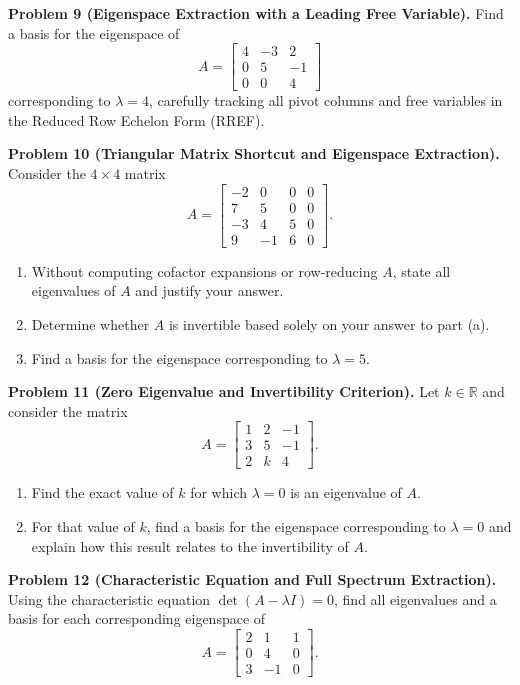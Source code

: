 \documentclass[11pt, letterpaper]{article}
\theoremstyle{definition}
\theoremstyle{remark}
\begin{document}
\textbf{Problem 9 (Eigenspace Extraction with a Leading Free Variable).}
Find a basis for the eigenspace of
\[
A = \begin{bmatrix} 4 & -3 & 2 \\ 0 & 5 & -1 \\ 0 & 0 & 4 \end{bmatrix}
\]
corresponding to $\lambda = 4$, carefully tracking all pivot columns and free variables in the Reduced Row Echelon Form (RREF).

\textbf{Problem 10 (Triangular Matrix Shortcut and Eigenspace Extraction).}
Consider the $4 \times 4$ matrix
\[
A = \begin{bmatrix} -2 & 0 & 0 & 0 \\ 7 & 5 & 0 & 0 \\ -3 & 4 & 5 & 0 \\ 9 & -1 & 6 & 0 \end{bmatrix}.
\]
\begin{enumerate}[label=(\alph*)]
    \item Without computing cofactor expansions or row-reducing $A$, state all eigenvalues of $A$ and justify your answer.
    \item Determine whether $A$ is invertible based solely on your answer to part (a).
    \item Find a basis for the eigenspace corresponding to $\lambda = 5$.
\end{enumerate}

\textbf{Problem 11 (Zero Eigenvalue and Invertibility Criterion).}
Let $k \in \mathbb{R}$ and consider the matrix
\[
A = \begin{bmatrix} 1 & 2 & -1 \\ 3 & 5 & -1 \\ 2 & k & 4 \end{bmatrix}.
\]
\begin{enumerate}[label=(\alph*)]
    \item Find the exact value of $k$ for which $\lambda = 0$ is an eigenvalue of $A$.
    \item For that value of $k$, find a basis for the eigenspace corresponding to $\lambda = 0$ and explain how this result relates to the invertibility of $A$.
\end{enumerate}

\textbf{Problem 12 (Characteristic Equation and Full Spectrum Extraction).}
Using the characteristic equation $\det(A - \lambda I) = 0$, find all eigenvalues and a basis for each corresponding eigenspace of
\[
A = \begin{bmatrix} 2 & 1 & 1 \\ 0 & 4 & 0 \\ 3 & -1 & 0 \end{bmatrix}.
\]
\end{document}
